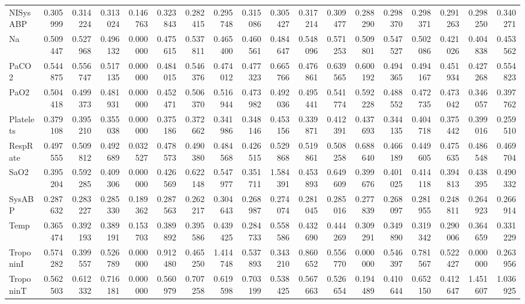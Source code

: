 \begin{tabular}{lrrrrrrrrrrrrrrrrr}
NISysABP & 0.305999 & 0.314224 & 0.313024 & 0.146763 & 0.323843 & 0.282415 & 0.295748 & 0.315086 & 0.305427 & 0.317214 & 0.309477 & 0.288290 & 0.298370 & 0.298371 & 0.291263 & 0.298250 & 0.340271 \\
Na & 0.509447 & 0.527968 & 0.496132 & 0.000000 & 0.475615 & 0.537811 & 0.465400 & 0.460561 & 0.484647 & 0.548096 & 0.571253 & 0.509801 & 0.547527 & 0.502086 & 0.421026 & 0.404838 & 0.453562 \\
PaCO2 & 0.544875 & 0.556747 & 0.517135 & 0.000000 & 0.484015 & 0.546376 & 0.474012 & 0.477323 & 0.665766 & 0.476861 & 0.639565 & 0.600192 & 0.494365 & 0.494167 & 0.451934 & 0.427268 & 0.554823 \\
PaO2 & 0.504418 & 0.499373 & 0.481931 & 0.000000 & 0.452471 & 0.506370 & 0.516944 & 0.473982 & 0.492036 & 0.495441 & 0.541774 & 0.592228 & 0.488552 & 0.472735 & 0.473042 & 0.346057 & 0.397762 \\
Platelets & 0.379108 & 0.395210 & 0.355038 & 0.000000 & 0.375186 & 0.372662 & 0.341986 & 0.348146 & 0.453156 & 0.339871 & 0.412391 & 0.437693 & 0.344135 & 0.404718 & 0.375442 & 0.399016 & 0.259510 \\
RespRate & 0.497555 & 0.509812 & 0.492689 & 0.032527 & 0.478573 & 0.490380 & 0.484568 & 0.426515 & 0.529868 & 0.519861 & 0.508258 & 0.688640 & 0.466189 & 0.449605 & 0.475635 & 0.486548 & 0.469704 \\
SaO2 & 0.395204 & 0.592285 & 0.409306 & 0.000000 & 0.426569 & 0.622148 & 0.547977 & 0.351711 & 1.584391 & 0.453893 & 0.649609 & 0.399676 & 0.401025 & 0.414118 & 0.394813 & 0.438395 & 0.490332 \\
SysABP & 0.287632 & 0.283227 & 0.285330 & 0.189362 & 0.287563 & 0.262217 & 0.304643 & 0.268987 & 0.274074 & 0.281045 & 0.285016 & 0.277839 & 0.268097 & 0.281955 & 0.248811 & 0.264923 & 0.266914 \\
Temp & 0.365474 & 0.392193 & 0.389191 & 0.153703 & 0.389892 & 0.395586 & 0.439425 & 0.284733 & 0.558586 & 0.432690 & 0.444269 & 0.309291 & 0.349890 & 0.319342 & 0.290006 & 0.364659 & 0.331229 \\
TroponinI & 0.574282 & 0.399557 & 0.526789 & 0.000000 & 0.912480 & 0.465250 & 1.414748 & 0.537893 & 0.343210 & 0.860652 & 0.556770 & 0.000000 & 0.546397 & 0.781567 & 0.522427 & 0.000000 & 0.263956 \\
TroponinT & 0.562503 & 0.612332 & 0.716181 & 0.000000 & 0.560979 & 0.707258 & 0.619598 & 0.703199 & 0.538425 & 0.567663 & 0.526654 & 0.194489 & 0.410644 & 0.652150 & 0.412647 & 1.451607 & 1.036925 \\

\end{tabular}
